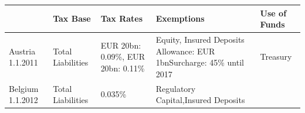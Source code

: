 \documentclass[]{tufte-handout}
\begin{document}
\begin{longtable}[]{@{}lllll@{}}
\toprule
\begin{minipage}[b]{0.17\columnwidth}\raggedright
\strut
\end{minipage} & \begin{minipage}[b]{0.17\columnwidth}\raggedright
Tax Base\strut
\end{minipage} & \begin{minipage}[b]{0.17\columnwidth}\raggedright
Tax Rates\strut
\end{minipage} & \begin{minipage}[b]{0.17\columnwidth}\raggedright
Exemptions\strut
\end{minipage} & \begin{minipage}[b]{0.17\columnwidth}\raggedright
Use of Funds\strut
\end{minipage}\tabularnewline
\midrule
\endhead
\begin{minipage}[t]{0.17\columnwidth}\raggedright
Austria 1.1.2011\strut
\end{minipage} & \begin{minipage}[t]{0.17\columnwidth}\raggedright
Total Liabilities\strut
\end{minipage} & \begin{minipage}[t]{0.17\columnwidth}\raggedright
EUR 20bn: 0.09\%, EUR 20bn: 0.11\%\strut
\end{minipage} & \begin{minipage}[t]{0.17\columnwidth}\raggedright
Equity, Insured Deposits Allowance: EUR 1bnSurcharge: 45\% until
2017\strut
\end{minipage} & \begin{minipage}[t]{0.17\columnwidth}\raggedright
Treasury\strut
\end{minipage}\tabularnewline
\begin{minipage}[t]{0.17\columnwidth}\raggedright
Belgium 1.1.2012\strut
\end{minipage} & \begin{minipage}[t]{0.17\columnwidth}\raggedright
Total Liabilities\strut
\end{minipage} & \begin{minipage}[t]{0.17\columnwidth}\raggedright
0.035\%\strut
\end{minipage} & \begin{minipage}[t]{0.17\columnwidth}\raggedright
Regulatory Capital,Insured Deposits\strut
\end{minipage} & \begin{minipage}[t]{0.17\columnwidth}\raggedright

\end{minipage}
\end{longtable}
\end{document}
